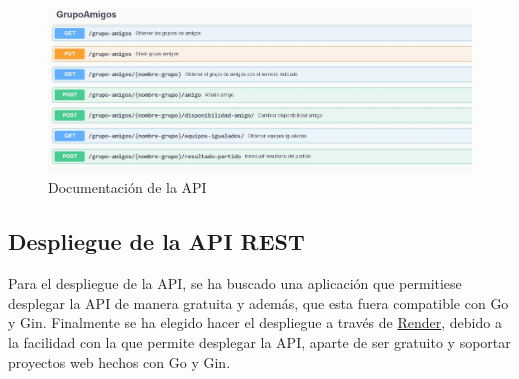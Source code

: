 \begin{figure}[H]
	\centering	
	\includegraphics[scale=0.25]{img/doc-api.jpg}
	\caption{Documentación de la API}
\end{figure}

\subsection{Despliegue de la API REST}
Para el despliegue de la API, se ha buscado una aplicación que permitiese desplegar la API de manera gratuita y además, que esta fuera compatible con Go y Gin.
Finalmente se ha elegido hacer el despliegue a través de \href{https://render.com/}{Render}, debido a la facilidad con la que permite desplegar la API, aparte de ser gratuito y soportar proyectos web hechos con Go y Gin.